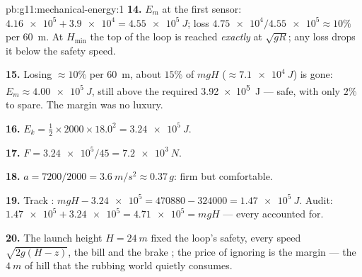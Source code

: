 \begin{solution}{pb:g11:mechanical-energy:1}
\textbf{14.} $E_m$ at the first sensor: $\num{4.16e5} + \num{3.9e4} =
\qty{4.55e5}{J}$; loss $\num{4.75e4}/\num{4.55e5} \approx 10\%$ per
\qty{60}{m}. At $H_{\min}$ the top of the loop is reached \emph{exactly}
at $\sqrt{gR}$; any loss drops it below the safety speed.

\textbf{15.} Losing $\approx 10\%$ per \qty{60}{m}, about $15\%$ of
$mgH$ ($\approx \qty{7.1e4}{J}$) is gone: $E_m \approx \qty{4.00e5}{J}$,
still above the required \qty{3.92e5}{J} --- safe, with only $2\%$ to
spare. The margin was no luxury.

\textbf{16.} $E_k = \tfrac12 \times 2000 \times 18.0^2 =
\qty{3.24e5}{J}$.

\textbf{17.} $F = \num{3.24e5}/45 = \qty{7.2e3}{N}$.

\textbf{18.} $a = 7200/2000 = \qty{3.6}{m/s^2} \approx 0.37\,g$:
firm but comfortable.

\textbf{19.} Track : $mgH - \num{3.24e5} = \num{470880} -
\num{324000} = \qty{1.47e5}{J}$. Audit: $\num{1.47e5} + \num{3.24e5} =
\num{4.71e5} = mgH$ --- every  accounted for.

\textbf{20.} The launch height $H = \qty{24}{m}$ fixed the loop's
safety, every speed $\sqrt{2g(H - z)}$, the  bill and the brake
; the price of ignoring  is the margin --- the $\qty{4}{m}$
of hill that the rubbing world quietly consumes.
\end{solution}
